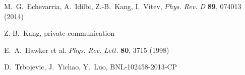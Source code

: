 \documentclass[12pt]{article}
\begin{document}
\begin{thebibliography}{9}
M.~G.~Echevarria, A.~Idilbi, Z.-B.~Kang, I.~Vitev,
{\it Phys. Rev. D} {\bf 89}, 074013 (2014)

Z.-B.~Kang, private communication

E.~A.~Hawker et al. {\it Phys. Rev. Lett.} {\bf 80}, 3715 (1998)

D.~Trbojevic, J.~Yichao, Y.~Luo, BNL-102458-2013-CP
\end{thebibliography}
\end{document}
